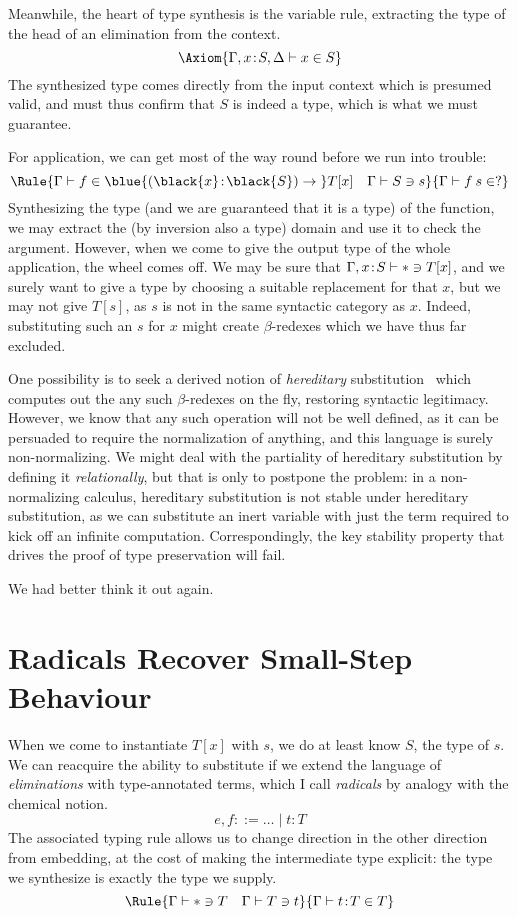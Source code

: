 \documentclass[natbib]{article}
\newcommand{\type}{\ast}
\newcommand{\hb}{\!:\!}
\newcommand{\PI}[2]{\blue{(\black{#1}\hb \black{#2})\to\;}}
\begin{document}
Meanwhile, the heart of type synthesis is the variable rule, extracting the type of the head of an elimination from the context.
\[
\Axiom{\SYN{\Gamma,x\hb S,\Delta}{x}{S}}
\]
The synthesized type comes directly from the input context which is presumed valid, and must thus confirm that $S$ is indeed a type, which is what we must guarantee.

For application, we can get most of the way round before we run into trouble:
\[
\Rule{\SYN\Gamma f {\PI xS T[x]} \quad \CHK\Gamma Ss}
     {\SYN\Gamma{f\:s}{?}}
\]
Synthesizing the type (and we are guaranteed that it is a type) of the function, we may extract the (by inversion also a type) domain and use it to check the argument. However, when we come to give the output type of the whole application, the wheel comes off. We may be sure that $\CHK{\Gamma,x\hb S}\type{T[x]}$, and we surely want to give a type by choosing a suitable replacement for that $x$, but we may not give $T[s]$, as $s$ is not in the same syntactic category as $x$. Indeed, substituting such an $s$ for $x$ might create $\beta$-redexes which we have thus far excluded.

One possibility is to seek a derived notion of \emph{hereditary} substitution~\cite{DBLP:conf/types/WatkinsCPW03} which computes out the any such $\beta$-redexes on the fly, restoring syntactic legitimacy. However, we know that any such operation will not be well defined, as it can be persuaded to require the normalization of anything, and this language is surely non-normalizing. We might deal with the partiality of hereditary substitution by defining it \emph{relationally}, but that is only to postpone the problem: in a non-normalizing calculus, hereditary substitution is not stable under hereditary substitution, as we can substitute an inert variable with just the term required to kick off an infinite computation. Correspondingly, the key stability property that drives the proof of type preservation will fail.

We had better think it out again.


\section{Radicals Recover Small-Step Behaviour}

When we come to instantiate $T[x]$ with $s$, we do at least know $S$, the type of $s$. We can reacquire the ability to substitute if we extend the language of \emph{eliminations} with type-annotated terms, which I call \emph{radicals} by analogy with the chemical notion.
\[
e,f ::= \ldots \;|\; t\hb T
\]
The associated typing rule allows us to change direction in the other direction from embedding, at the cost of making the intermediate type explicit: the type we synthesize is exactly the type we supply.
\[\Rule{\CHK\Gamma\type T\quad \CHK\Gamma Tt}
       {\SYN\Gamma{t\hb T}T}
\]



\end{document}
